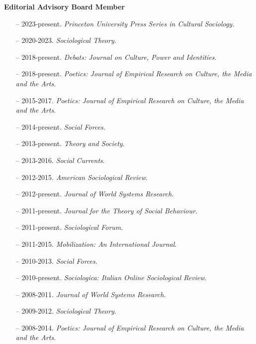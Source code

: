 \noindent\textbf{Editorial Advisory Board Member} 

\begin{itemize}[itemsep=-0.5ex]
    \item[--] 2023-present. {\em Princeton University Press Series in Cultural Sociology.}
    \item[--] 2020-2023. {\em Sociological Theory}.
	\item[--] 2018-present. {\em Debats: Journal on Culture, Power and Identities}. 
    \item[--] 2018-present. {\em Poetics: Journal of Empirical Research on Culture, the Media and the Arts}.
    \item[--] 2015-2017. {\em Poetics: Journal of Empirical Research on Culture, the Media and the Arts}.
    \item[--] 2014-present. {\em Social Forces}.
    \item[--] 2013-present.  {\em Theory and Society}.
    \item[--] 2013-2016. {\em Social Currents}.
    \item[--] 2012-2015. {\em American Sociological Review}. 
    \item[--] 2012-present. {\em Journal of World Systems Research}.
    \item[--] 2011-present. {\em Journal for the Theory of Social Behaviour}.
    \item[--] 2011-present. {\em Sociological Forum}.
    \item[--] 2011-2015. {\em Mobilization: An International Journal}.
    \item[--] 2010-2013. {\em Social Forces}.
    \item[--] 2010-present. {\em Sociologica: Italian Online Sociological Review}.
    \item[--] 2008-2011. {\em Journal of World Systems Research}.
    \item[--] 2009-2012. {\em Sociological Theory}.
    \item[--] 2008-2014. {\em Poetics: Journal of Empirical Research on Culture, the Media and the Arts}.
\end{itemize}